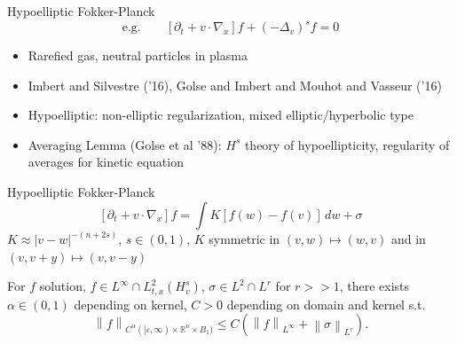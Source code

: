 \documentclass{beamer}
\newcommand{\R}{\mathbb{R}}
\newcommand{\eps}{\varepsilon}
\newcommand{\norm}[1]{\left\lVert#1\right\rVert}
\newcommand{\paren}[1]{\left( #1 \right)}
\newcommand{\bracket}[1]{\left[ #1 \right]}
\newcommand{\del}{\partial}
\newcommand{\grad}{\nabla}
\newcommand{\Laplace}{\Delta}
\begin{document}
\begin{frame}{Hypoelliptic Fokker-Planck}
\pause
\[\textrm{e.g.} \qquad \bracket{\del_t + v\cdot\grad_x} f + \paren{-\Laplace_v}^s f = 0 \]

\begin{itemize}
\item Rarefied gas, neutral particles in plasma
\item Imbert and Silvestre ('16), Golse and Imbert and Mouhot and Vasseur ('16)
\item Hypoelliptic: non-elliptic regularization, mixed elliptic/hyperbolic type
\item Averaging Lemma (Golse et al '88): $H^s$ theory of hypoellipticity, regularity of averages for kinetic equation
\end{itemize}
\end{frame}


\begin{frame}{Hypoelliptic Fokker-Planck}
\[ \bracket{\del_t + v\cdot\grad_x} f = \int K [f(w)-f(v)] \,dw + \sigma \]
$K \approx |v-w|^{-(n+2s)}$, $s \in (0,1)$, $K$ symmetric in $(v,w)\mapsto(w,v)$ and in $(v,v+y)\mapsto(v,v-y)$

\begin{theorem}[S. [SIMA, '19{]}]
For $f$ solution, $f \in L^\infty \cap L^2_{t,x}(H^s_v)$, $\sigma \in L^2 \cap L^r$ for $r >> 1$, 
there exists $\alpha \in (0,1)$ depending on kernel, $C > 0$ depending on domain and kernel s.t.
\[ \norm{f}_{C^\alpha([\eps,\infty)\times\R^n\times B_1)} \leq C \paren{\norm{f}_{L^\infty} + \norm{\sigma}_{L^r}}. \]
\end{theorem}

\end{frame}


%

\end{document}
